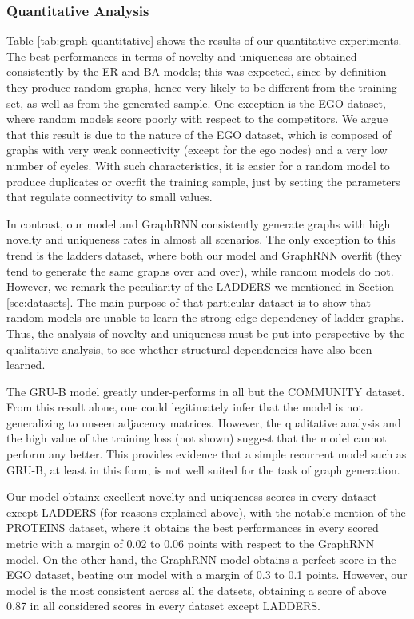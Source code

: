\subsubsection*{Quantitative Analysis}
Table \ref{tab:graph-quantitative} shows the results of our quantitative experiments. The best performances in terms of novelty and uniqueness are obtained consistently by the ER and BA models; this was expected, since by definition they produce random graphs, hence very likely to be different from the training set, as well as from the generated sample. One exception is the EGO dataset, where random models score poorly with respect to the competitors. We argue that this result is due to the nature of the EGO dataset, which is composed of graphs with very weak connectivity (except for the ego nodes) and a very low number of cycles. With such characteristics, it is easier for a random model to produce duplicates or overfit the training sample, just by setting the parameters that regulate connectivity to small values.

In contrast, our model and GraphRNN consistently generate graphs with high novelty and uniqueness rates in almost all scenarios. The only exception to this trend is the ladders dataset, where both our model and GraphRNN overfit (they tend to generate the same graphs over and over), while random models do not. However, we remark the peculiarity of the LADDERS we mentioned in Section \ref{sec:datasets}. The main purpose of that particular dataset is to show that random models are unable to learn the strong edge dependency of ladder graphs. Thus, the analysis of novelty and uniqueness must be put into perspective by the qualitative analysis, to see whether structural dependencies have also been learned.

The GRU-B model greatly under-performs in all but the COMMUNITY dataset. From this result alone, one could legitimately infer that the model is not generalizing to unseen adjacency matrices. However, the qualitative analysis and the high value of the training loss (not shown) suggest that the model cannot perform any better. This provides evidence that a simple recurrent model such as GRU-B, at least in this form, is not well suited for the task of graph generation.

Our model obtainx excellent novelty and uniqueness scores in every dataset except LADDERS (for reasons explained above), with the notable mention of the PROTEINS dataset, where it obtains the best performances in every scored metric with a margin of 0.02 to 0.06 points with respect to the GraphRNN model. On the other hand, the GraphRNN model obtains a perfect score in the EGO dataset, beating our model with a margin of 0.3 to 0.1 points. However, our model is the most consistent across all the datsets, obtaining a score of above 0.87 in all considered scores in every dataset except LADDERS.


